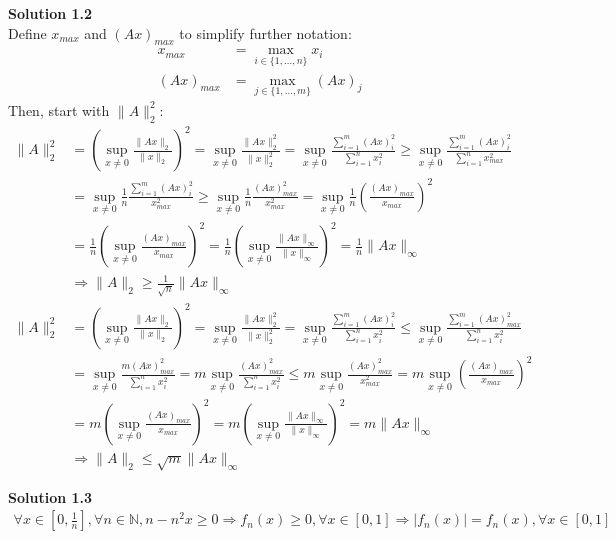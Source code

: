 \documentclass[fleqn, 10.5pt, a4paper]{article}
\def\N{{\mathbb N}}
\theoremstyle{definition}
\numberwithin{equation}{section}
\newcommand{\supx}{\sup_{x\neq0}}
\begin{document}
\noindent \textbf {Solution 1.2} \\
Define $x_{max}$ and $\left(Ax\right)_{max}$ to simplify further notation:
\begin{align*}
	x_{max} &= \max_{i\in\{1,\dots,n\}} x_i \\
	\left(Ax\right)_{max} &= \max_{j\in\{1,\dots,m\}}\left(Ax\right)_j
\end{align*}
Then, start with $\|A\|_2^2$:
\begin{align*}
\|A\|_2^2&=\left(\supx\frac{\|Ax\|_2}{\|x\|_2}\right)^2=\supx\frac{\|Ax\|_2^2}{\|x\|_2^2} = \supx \frac{\sum_{i=1}^{m} \left(Ax\right)_i^2}{\sum_{i=1}^{n} x_i^2} \geq \supx \frac{\sum_{i=1}^{m} \left(Ax\right)_i^2}{\sum_{i=1}^{n} x_{max}^2} \\
&=\supx \frac{1}{n}\frac{\sum_{i=1}^{m} \left(Ax\right)_i^2}{x_{max}^2} \geq \supx \frac{1}{n}\frac{\left(Ax\right)_{max}^2}{x_{max}^2} = \supx \frac{1}{n} \left(\frac{\left(Ax\right)_{max}}{x_{max}}\right)^2 \\
&= \frac{1}{n}  \left(\supx\frac{\left(Ax\right)_{max}}{x_{max}}\right)^2 =\frac{1}{n} \left(\supx \frac{\|Ax\|_\infty}{\|x\|_\infty}\right)^2= \frac{1}{n}\|Ax\|_\infty \\
&\Rightarrow \|A\|_2 \geq \frac{1}{\sqrt{n}}\|Ax\|_\infty
\end{align*}
\begin{align*}
\|A\|_2^2&=\left(\supx\frac{\|Ax\|_2}{\|x\|_2}\right)^2=\supx\frac{\|Ax\|_2^2}{\|x\|_2^2} = \supx \frac{\sum_{i=1}^{m} \left(Ax\right)_{i}^2}{\sum_{i=1}^{n} x_i^2} \leq \supx \frac{\sum_{i=1}^{m} \left(Ax\right)_{max}^2}{\sum_{i=1}^{n} x_{i}^2} \\&= \supx \frac{m \left(Ax\right)_{max}^2}{\sum_{i=1}^{n} x_{i}^2} = m\supx \frac{\left(Ax\right)_{max}^2}{\sum_{i=1}^{n} x_{i}^2} \leq m\supx \frac{\left(Ax\right)_{max}^2}{x_{max}^2} = m\supx \left(\frac{\left(Ax\right)_{max}}{x_{max}}\right)^2 \\
&=m\left(\supx \frac{\left(Ax\right)_{max}}{x_{max}}\right)^2 = m\left(\supx \frac{\|Ax\|_\infty}{\|x\|_\infty}\right)^2 = m\|Ax\|_\infty \\
&\Rightarrow \|A\|_2 \leq \sqrt{m}\|Ax\|_\infty
\end{align*}

\noindent \textbf {Solution 1.3} \\
\begin{align*}
\forall x \in \left[0,\frac{1}{n}\right], \forall n \in \N, n - n^2 x \geq 0 \Rightarrow f_n (x) \geq 0, \forall x \in [0,1] \Rightarrow \lvert f_n(x) \rvert = f_n(x), \forall x \in [0,1] \\
\end{align*}
\end{document}
